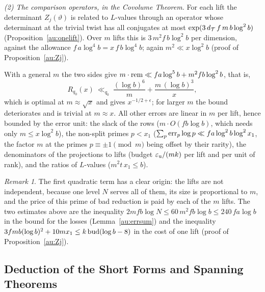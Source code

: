 \documentclass[10pt]{amsart}
\theoremstyle{definition}
\theoremstyle{remark}
\newtheorem{remark}[theorem]{Remark}
\begin{document}
\emph{(2) The comparison operators, in the Covolume Theorem.} For each lift the determinant $Z_j(\vartheta)$
is related to $L$-values through an operator whose determinant at the trivial twist has all
conjugates at most $\exp(3\,d_{\mathcal T}\,f\,m\,b\log^2b)$ (Proposition~\ref{au:onelift}). Over $m$ lifts this
is $3\,m^2f\,b\log^2b$ per dimension, against the allowance $f\,a\log^4b=x\,f\,b\log^4b$; again
$m^2\ll x\log^2b$ (proof of Proposition~\ref{au:Zj}).

With a general $m$ the two sides give $m\cdot\operatorname{rem}\ll fa\log^5b+m^2fb\log^2b$, that is,
\[
R_{q_0}(x)\ \ll_{q_0}\ \frac{(\log b)^6}{m}+\frac{m\,(\log b)^3}{x},
\]
which is optimal at $m\approx\sqrt x$ and gives $x^{-1/2+\epsilon}$; for larger $m$ the bound
deteriorates and is trivial at $m\approx x$. All other errors are linear in $m$ per lift, hence
bounded by the error unit: the slack of the rows ($m\cdot O(fb\log b)$, which needs only
$m\le x\log^2b$), the non-split primes $p<x_1$ ($\sum_p\operatorname{err}_p\log p\ll fa\log^2b\log^2x_1$, the
factor $m$ at the primes $p\equiv\pm1\pmod m$ being offset by their rarity), the denominators of
the projections to lifts (budget $\varepsilon_{\mathrm u}/(mk)$ per lift and per unit of rank), and the ratios of
$L$-values ($m^2t\,x_1\le b$).

\begin{remark}\label{au:barrier-remark}
The first quadratic term has a clear origin: the lifts are not independent, because one level
$N$ serves all of them, its size is proportional to $m$, and the price of this prime of bad
reduction is paid by each of the $m$ lifts. The two estimates above are the inequality
$2mfb\log N\le60\,m^2fb\log b\le240\,fa\log b$ in the bound for the losses (Lemma~\ref{au:errsum}) and the
inequality $3fmb(\log b)^2+10mx_1\le k\,\mathrm{bud}(\log b-8)$ in the cost of one lift (proof of
Proposition~\ref{au:Zj}).
\end{remark}

\subsection{Deduction of the Short Forms and Spanning Theorems}\label{ss:au-proofAB}
\end{document}
